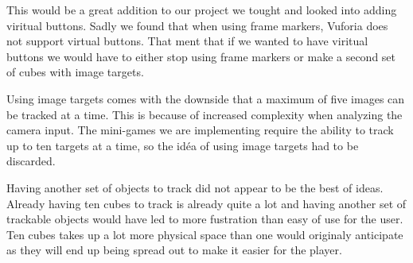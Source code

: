 This would be a great addition to our project we tought and looked into adding viritual buttons.
Sadly we found that when using frame markers, Vuforia does not support virtual buttons. That ment that if we wanted to have viritual buttons we would have to either stop using frame markers or make a second set of cubes with image targets.

Using image targets comes with the downside that a maximum of five images can be tracked at a time. This is because of increased complexity when analyzing the camera input. The mini-games we are implementing require the ability to track up to ten targets at a time, so the id\'ea of using image targets had to be discarded.

Having another set of objects to track did not appear to be the best of ideas. 
Already having ten cubes to track is already quite a lot and having another set of trackable objects would have led to more fustration than easy of use for the user.
Ten cubes takes up a lot more physical space than one would originaly anticipate as they will end up being spread out to make it easier for the player.
